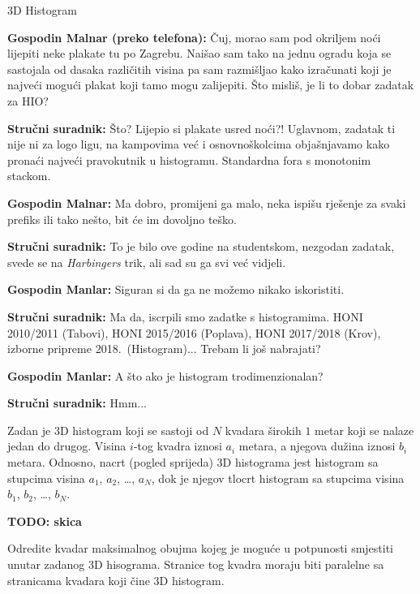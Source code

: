 \begin{statement}[
  problempoints=100,
  timelimit=1 sekunda,
  memorylimit=512 MiB,
]{3D Histogram}

\textbf{Gospodin Malnar (preko telefona):} Čuj, morao sam pod okriljem noći
lijepiti neke plakate tu po Zagrebu. Naišao sam tako na jednu ogradu koja se
sastojala od dasaka različitih visina pa sam razmišljao kako izračunati koji
je najveći mogući plakat koji tamo mogu zalijepiti. Što misliš, je li to
dobar zadatak za HIO?

\textbf{Stručni suradnik:} Što? Lijepio si plakate usred noći?! Uglavnom,
zadatak ti nije ni za logo ligu, na kampovima već i osnovnoškolcima objašnjavamo
kako pronaći najveći pravokutnik u histogramu. Standardna fora s monotonim
stackom.

\textbf{Gospodin Malnar:} Ma dobro, promijeni ga malo, neka ispišu rješenje za
svaki prefiks ili tako nešto, bit će im dovoljno teško.

\textbf{Stručni suradnik:} To je bilo ove godine na studentskom, nezgodan
zadatak, svede se na \textit{Harbingers} trik, ali sad su ga svi već
vidjeli.

\textbf{Gospodin Manlar:} Siguran si da ga ne možemo nikako iskoristiti.

\textbf{Stručni suradnik:} Ma da, iscrpili smo zadatke s histogramima. HONI
  2010/2011 (Tabovi), HONI 2015/2016 (Poplava), HONI 2017/2018 (Krov), izborne
  pripreme 2018.\ (Histogram)... Trebam li još nabrajati?

\textbf{Gospodin Manlar:} A što ako je histogram trodimenzionalan?

\textbf{Stručni suradnik:} Hmm...

Zadan je 3D histogram koji se sastoji od $N$ kvadara širokih $1$ metar koji
se nalaze jedan do drugog. Visina $i$-tog kvadra iznosi $a_i$ metara, a njegova
dužina iznosi $b_i$ metara. Odnosno, nacrt (pogled sprijeda) 3D histograma jest
histogram sa stupcima visina $a_1$, $a_2$, \dots, $a_N$, dok je njegov tlocrt
histogram sa stupcima visina $b_1$, $b_2$, \dots, $b_N$.

\textbf{TODO: skica}

Odredite kvadar maksimalnog obujma kojeg je moguće u potpunosti smjestiti unutar
zadanog 3D hisograma. Stranice tog kvadra moraju biti paralelne sa stranicama
kvadara koji čine 3D histogram.


\end{statement}
